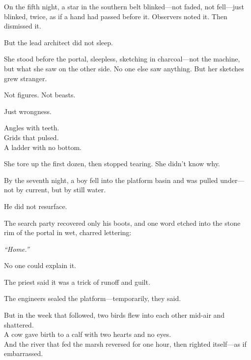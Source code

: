 \documentclass[9pt]{article}
\begin{document}
\vspace{0.5em}
On the fifth night, a star in the southern belt blinked---not faded, not fell---just blinked, twice, as if a hand had passed before it. Observers noted it. Then dismissed it.

\vspace{0.5em}
But the lead architect did not sleep.

\vspace{0.5em}
She stood before the portal, sleepless, sketching in charcoal---not the machine, but what she saw on the other side. No one else saw anything. But her sketches grew stranger.

\vspace{0.5em}
Not figures. Not beasts.

\vspace{0.5em}
Just wrongness.

\vspace{0.5em}
Angles with teeth.\\
Grids that pulsed.\\
A ladder with no bottom.

\vspace{0.5em}
She tore up the first dozen, then stopped tearing. She didn’t know why.

\vspace{0.5em}
By the seventh night, a boy fell into the platform basin and was pulled under---not by current, but by still water.

\vspace{0.5em}
He did not resurface.

\vspace{0.5em}
The search party recovered only his boots, and one word etched into the stone rim of the portal in wet, charred lettering:

\vspace{0.5em}
\textit{``Home.''}

\vspace{0.5em}
No one could explain it.

\vspace{0.5em}
The priest said it was a trick of runoff and guilt.

\vspace{0.5em}
The engineers sealed the platform---temporarily, they said.

\vspace{0.5em}
But in the week that followed, two birds flew into each other mid-air and shattered.\\
A cow gave birth to a calf with two hearts and no eyes.\\
And the river that fed the marsh reversed for one hour, then righted itself---as if embarrassed.
\end{document}
